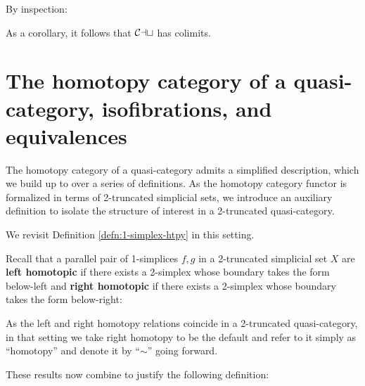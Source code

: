    By inspection:



   As a corollary, it follows that ${\mathord{\mathcal{Cat}}}$ has colimits.

\section{The homotopy category of a quasi-category, isofibrations, and equivalences}\label{sec:homotopy-category}

   The homotopy category of a quasi-category admits a simplified description, which we build up to over a series of definitions. As the homotopy category functor is formalized in terms of 2-truncated simplicial sets, we introduce an auxiliary definition to isolate the structure of interest in a 2-truncated quasi-category.




   We revisit Definition \ref{defn:1-simplex-htpy} in this setting.

   Recall that a parallel pair of 1-sim\-plices $f,g$ in a 2-truncated simplicial set $X$ are \textbf{left homotopic} if there exists a 2-simplex whose boundary takes the form below-left and \textbf{right homotopic} if there exists a 2-simplex whose boundary takes the form below-right:
   \begin{center}
   \end{center}



As the left and right homotopy relations coincide in a 2-truncated quasi-category, in that setting we take right homotopy to be the default and refer to it simply as ``homotopy'' and denote it by ``$\sim$'' going forward.





These results now combine to justify the following definition:

